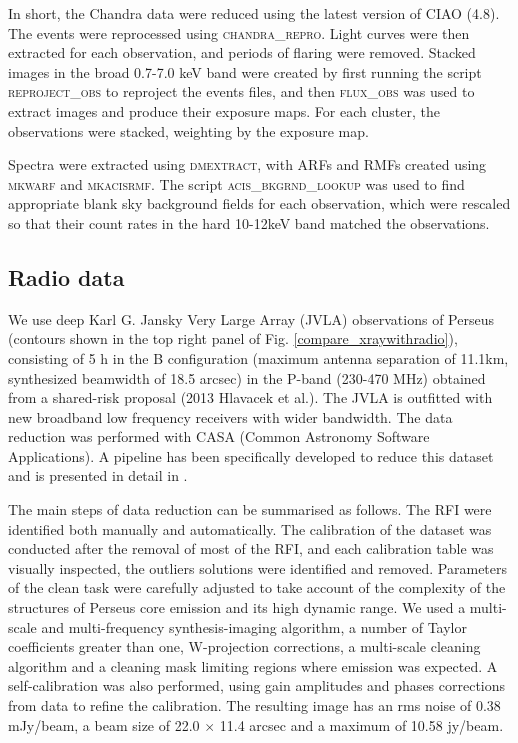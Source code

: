 \documentclass[useAMS,usenatbib]{mn2e}
\begin{document}
In short, the Chandra data were reduced using the latest version of CIAO (4.8). The events were reprocessed using 
\textsc{chandra\_repro}. Light curves were then extracted for each observation, and periods of flaring were removed. 
Stacked images in the broad 0.7-7.0 keV band were created by first running the script \textsc{reproject\_obs} to 
reproject the events files, and then \textsc{flux\_obs} was used to extract images and produce their exposure maps. 
For each cluster, the observations were stacked, weighting by the exposure map. 
  
Spectra were extracted using \textsc{dmextract}, with ARFs and RMFs created using \textsc{mkwarf} and 
\textsc{mkacisrmf}. The script \textsc{acis\_bkgrnd\_lookup} was used to find appropriate blank sky background 
fields for each observation, which were rescaled so that their count rates in the hard 10-12keV band matched 
the observations. 




\subsection{Radio data}

We use deep Karl G. Jansky Very Large Array (JVLA) observations of
Perseus (contours shown in the top right panel of Fig. \ref{compare_xraywithradio}), consisting of 5 h in the B configuration (maximum antenna
separation of 11.1km, synthesized beamwidth of 18.5 arcsec) in the P-band
(230-470 MHz) obtained from a shared-risk proposal (2013 Hlavacek et al.).
The JVLA is outfitted with new broadband low frequency receivers with
wider bandwidth. The data reduction was performed with CASA (Common
Astronomy Software Applications). A pipeline has been specifically
developed to reduce this dataset and is presented in detail in
\citet{Gendron-Marsolais2017}.

The main steps of data reduction can be
summarised as follows. The RFI were identified both manually and
automatically. The calibration of the dataset was conducted after the
removal of most of the RFI, and each calibration table was visually
inspected, the outliers solutions were identified and removed. Parameters
of the clean task were carefully adjusted to take account of the
complexity of the structures of Perseus core emission and its high dynamic
range. We used a multi-scale and multi-frequency synthesis-imaging
algorithm, a number of Taylor coefficients greater than one, W-projection
corrections, a multi-scale cleaning algorithm and a cleaning mask limiting
regions where emission was expected. A self-calibration was also
performed, using gain amplitudes and phases corrections from data to
refine the calibration. The resulting image has an rms noise of 0.38
mJy/beam, a beam size of 22.0 $\times$ 11.4 arcsec and a maximum of 10.58
jy/beam.
\end{document}

